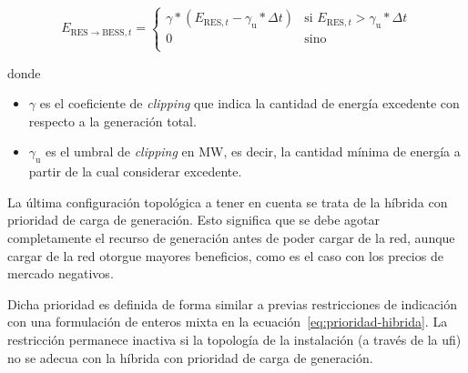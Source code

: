 \begin{samepage}

  \begin{equation}%
    \label{eq:clipping}
    E_{\mathrm{RES} \rightarrow \mathrm{BESS}, t} =
    \begin{cases}
      \gamma * \left(E_{\mathrm{RES}, t} - \gamma_{\mathrm{u}} * \Delta t\right) & \text{si } E_{\mathrm{RES}, t} > \gamma_{\mathrm{u}} * \Delta t \\
      0                                                                          & \text{sino}                                                     \\
    \end{cases}
  \end{equation}

  donde

  \begin{itemize}

    \item \( \gamma \) es el coeficiente de \textit{clipping} que indica la cantidad de energía excedente con respecto a la generación total.

    \item \( \gamma_{\mathrm{u}} \) es el umbral de \textit{clipping} en \si{\mega\watt}, es decir, la cantidad mínima de energía a partir de la cual considerar excedente.

  \end{itemize}

\end{samepage}

La última configuración topológica a tener en cuenta se trata de la híbrida con prioridad de carga de generación. Esto significa que se debe agotar completamente el recurso de generación antes de poder cargar de la red, aunque cargar de la red otorgue mayores beneficios, como es el caso con los precios de mercado negativos.

Dicha prioridad es definida de forma similar a previas restricciones de indicación con una formulación de enteros mixta en la ecuación~\ref{eq:prioridad-hibrida}. La restricción permanece inactiva si la topología de la instalación (a través de la \gls{ufi}) no se adecua con la híbrida con prioridad de carga de generación.

